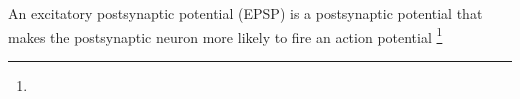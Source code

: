 \documentclass[a4paper]{article}
\title{}
\date{}
\author{Mohammad Rahmani}
\begin{document}
\maketitle
    An excitatory postsynaptic potential (EPSP) is a postsynaptic potential that makes the postsynaptic neuron more likely to fire an action potential \footnote{}
    
    
\end{document}
